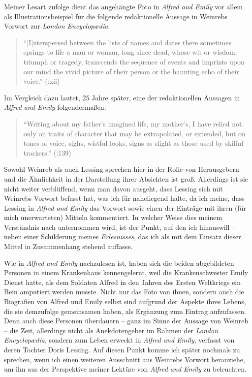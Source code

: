 \documentclass[fontsize=12pt]{scrartcl}
\begin{document}
Meiner Lesart zufolge dient das angeh\"angte Foto in \textit{Alfred and Emily} vor allem als Illustrationsbeispiel f\"ur die folgende redaktionelle Aussage in Weinrebs Vorwort zur \textit{London Encyclop{\ae}dia}: 

\singlespacing
\begin{quote}
"`[I]nterspersed between the lists of names and dates there sometimes springs to life a man or woman, long since dead, whose wit or wisdom, triumph or tragedy, transcends the sequence of events and imprints upon our mind the vivid picture of their person or the haunting echo of their voice."' (\cite{Weinreb1983}:xii)
\end{quote} 
\onehalfspacing

Im Vergleich dazu lautet, 25 Jahre sp\"ater, eine der redaktionellen Aussagen in \textit{Alfred and Emily} folgenderma{\ss}en: 

\singlespacing
\begin{quote}
"`Writing about my father's imagined life, my mother's, I have relied not only on traits of character that may be extrapolated, or extended, but on tones of voice, sighs, wistful looks, signs as slight as those used by skilful trackers."' (\cite{Lessing2008}:139)
\end{quote} 
\onehalfspacing

Sowohl Weinreb als auch Lessing sprechen \mbox{hier} in der Rolle von He\-rausgebern\textsuperscript{\tiny *} und die \"Ahnlichkeit in der Darstellung ihrer Absichten ist gro{\ss}. Al\-ler\-dings ist sie nicht weiter verbl\"uffend, wenn man davon ausgeht, dass Lessing sich mit Weinrebs Vorwort befasst hat, was ich f\"ur naheliegend halte, da ich meine, dass Lessing in \textit{Alfred and Emily} das Vorwort sowie einen der Eintr\"age mit ihren (f\"ur mich unerwarteten) Mitteln kommentiert. In welcher Weise dies meinem Verst\"andnis nach unternommen wird, ist der Punkt, auf den ich hinauswill -- neben einer Schilderung meines \textit{Erlesnisses}, das ich als mit dem Einsatz dieser Mittel in Zusammenhang stehend auffasse. 

Wie in \textit{Alfred and Emily} nachzulesen ist, haben sich die beiden abgebildeten Per\-so\-nen in einem Krankenhaus kennengelernt, weil die Krankenschwester Emily Dienst hatte, als dem Soldaten Alfred in den Jahren des Ersten Weltkriegs ein Bein amputiert werden musste. Nicht nur das Foto von ihnen, sondern auch die Biografien von Alfred und Emily \mbox{selbst} sind aufgrund der Aspekte ihres Lebens, die sie demzufolge gemeinsamen haben, als Erg\"anzung zum Eintrag aufzufassen. Denn auch diese Per\-so\-nen \"uberdauern -- ganz im Sinne der Aussage von Weinreb -- die Zeit, al\-ler\-dings nicht als Anekdotengeber\textsuperscript{\tiny *} im Rahmen der \textit{London Encyclop{\ae}dia}, sondern zum Leben erweckt in \textit{Alfred and Emily}, verfasst von deren Tochter Doris Lessing. Auf diesen Punkt komme ich sp\"ater nochmals zu sprechen, wenn ich einen weiteren Aus\-schnitt aus Weinrebs Vorwort heranziehe, um ihn aus der Perspektive meiner Lekt\"ure von \textit{Alfred and Emily} zu beleuchten.
\end{document}
